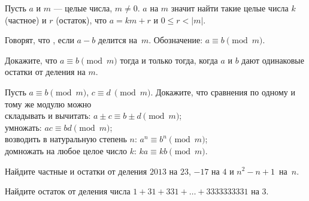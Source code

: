 \documentclass[a4paper,12pt]{article}
\begin{document}


\smallskip

Пусть $a$ и $m$ --- целые числа, $m\ne 0$.
 $a$ на $m$  значит найти
такие целые числа $k$ (частное) и $r$ (остаток),
что $a = km + r$ и $0\leq r < |m|$.






Говорят, что , если
$a-b$ делится на~$m$. Обозначение: $a\equiv b\!\pmod{m}$.

Докажите, что $a\equiv b\!\pmod{m}$ тогда и только тогда, когда $a$ и $b$
дают одинаковые остатки от деления на $m$.

{

}

Пусть $a\equiv b\!\pmod{m}$,  $c\equiv d\ \!\pmod{m}$.
Докажите, что сравнения по одному и тому же модулю можно\\ %
складывать и вычитать: $a\pm c\equiv b\pm d\!\pmod{m}$;\\
умножать: $ac\equiv bd\!\pmod{m}$;\\
возводить в натуральную степень $n$: $a^n\equiv b^n\!\pmod{m}$;\\
домножать на любое целое число $k$: $ka\equiv kb\!\pmod{m}$.

Найдите частные и остатки от деления $2013$ на $23$, $-17$ на $4$ и
$n^2-n+1$~на~$n$.

Найдите остаток от деления числа $1+31+331+\ldots+3333333331$ на $3$.
\end{document}
